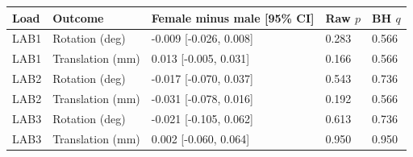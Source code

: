 \begin{tabular}{lllll}
\toprule
Load & Outcome & Female minus male [95\% CI] & Raw $p$ & BH $q$ \\
\midrule
LAB1 & Rotation (deg) & -0.009 [-0.026, 0.008] & 0.283 & 0.566 \\
LAB1 & Translation (mm) & 0.013 [-0.005, 0.031] & 0.166 & 0.566 \\
LAB2 & Rotation (deg) & -0.017 [-0.070, 0.037] & 0.543 & 0.736 \\
LAB2 & Translation (mm) & -0.031 [-0.078, 0.016] & 0.192 & 0.566 \\
LAB3 & Rotation (deg) & -0.021 [-0.105, 0.062] & 0.613 & 0.736 \\
LAB3 & Translation (mm) & 0.002 [-0.060, 0.064] & 0.950 & 0.950 \\
\bottomrule
\end{tabular}
